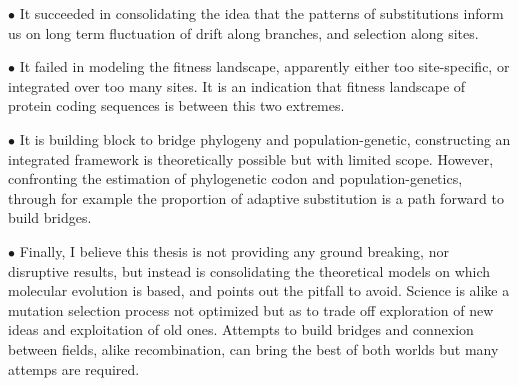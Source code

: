 $\bullet$ It succeeded in consolidating the idea that the patterns of substitutions inform us on long term fluctuation of drift along branches, and selection along sites.

$\bullet$ It failed in modeling the fitness landscape, apparently either too site-specific, or integrated over too many sites.
It is an indication that fitness landscape of protein coding sequences is between this two extremes.

$\bullet$ It is building block to bridge phylogeny and population-genetic, constructing an integrated framework is theoretically possible but with limited scope.
However, confronting the estimation of phylogenetic codon and population-genetics, through for example the proportion of adaptive substitution is a path forward to build bridges.

$\bullet$ Finally, I believe this thesis is not providing any ground breaking, nor disruptive results, but instead is consolidating the theoretical models on which molecular evolution is based, and points out the pitfall to avoid.
Science is alike a mutation selection process not optimized but as to trade off exploration of new ideas and exploitation of old ones.
Attempts to build bridges and connexion between fields, alike recombination, can bring the best of both worlds but many attemps are required.

